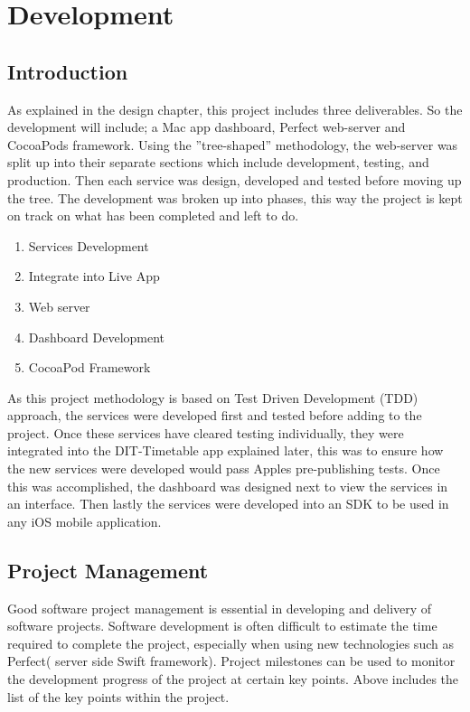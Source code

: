 \chapter{Development}

\label{ch:conclusions}

\section{Introduction}

As explained in the design chapter, this project includes three deliverables. So the development will include; a Mac app dashboard, Perfect web-server and CocoaPods framework. Using the ”tree-shaped” methodology, the web-server was split up into their separate sections which include development, testing, and production. Then each service was design, developed and tested before moving up the tree. The development was broken up into phases, this way the project is kept on track on what has been completed and left to do.

\begin{enumerate}
  \item Services Development
  \item Integrate into Live App
  \item Web server 
  \item Dashboard Development
  \item CocoaPod Framework 
\end{enumerate}

As this project methodology is based on Test Driven Development (TDD) approach, the services were developed first and tested before adding to the project. Once these services have cleared testing individually, they were integrated into the DIT-Timetable app explained later, this was to ensure how the new services were developed would pass Apples pre-publishing tests. Once this was accomplished, the dashboard was designed next to view the services in an interface. Then lastly the services were developed into an SDK to be used in any iOS mobile application.

\section{Project Management}

Good software project management is essential in developing and delivery of software projects. Software development is often difficult to estimate the time required to complete the project, especially when using new technologies such as Perfect( server side Swift framework). Project milestones can be used to monitor the development progress of the project at certain key points. Above includes the list of the key points within the project. 

